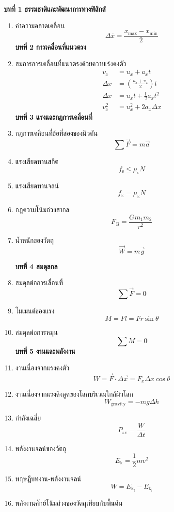 \documentclass[12pt, a4paper]{article}
\begin{document}
	\begin{center}
		\hspace*{1.05cm}
	\end{center}
	\hspace*{1.05cm}\textbf{บทที่ 1 ธรรมชาติและพัฒนาการทางฟิสิกส์}
\begin{enumerate}
	\item ค่าความคลาดเคลื่อน
		\[\Delta \overbar{x}=\frac{x_\text{max}-x_\text{min}}{2}\]
	\textbf{บทที่ 2 การเคลื่อนที่แนวตรง}
	\item สมการการเคลื่อนที่แนวตรงด้วยความเร่งคงตัว
		\begin{align*}
			v_x&=u_x+a_xt\\
			\Delta x&=\left(\frac{u_x+v_x}{2}\right)t\\
			\Delta x&=u_xt+\frac{1}{2}a_xt^2\\
			v_x^2&=u_x^2+2a_x\Delta x
		\end{align*}
	\textbf{บทที่ 3 แรงและกฎการเคลื่อนที่}
	\item กฎการเคลื่อนที่ข้อที่สองของนิวตัน
		\[\sum \vec{F}=m\vec{a}\]
	\item แรงเสียดทานสถิต
		\[f_{\text{s}}\leq\mu_\text{s}N\]
	\item แรงเสียดทานจลน์
		\[f_\text{k}=\mu_\text{k}N\]
	\item กฎความโน้มถ่วงสากล
		\[F_\text{G}=\frac{Gm_1m_2}{r^2}\]
	\item น้ำหนักของวัตถุ
		\[\vec{W}=m\vec{g}\]
	\begin{center}
	\end{center}
	\textbf{บทที่ 4 สมดุลกล}
	\item สมดุลต่อการเลื่อนที่
		\[\sum \vec{F}=0\]
	\item โมเมนต์ของแรง
		\[M=Fl=Fr\sin\theta\]
	\item สมดุลต่อการหมุน
		\[\sum M=0\]
	\textbf{บทที่ 5 งานและพลังงาน}
	\item งานเนื่องจากแรงคงตัว
		  \[W=\vec{F}\cdot\Delta \vec{x}=F_x\Delta x\cos\theta\]
	\item งานเนื่องจากแรงดึงดูดของโลกบริเวณใกล้ผิวโลก
		\[W_{\text{gravity}}=-mg\Delta h\]
	\item กำลังเฉลี่ย
		\[P_{\text{av}}=\frac{W}{\Delta t}\]
	\item พลังงานจลน์ของวัตถุ
		\[E_\text{k}=\frac{1}{2}mv^2\]
	\item ทฤษฎีบทงาน-พลังงานจลน์
		\[W=E_\mathrm{k_f}-E_\mathrm{k_i}\]
	\item พลังงานศักย์โน้มถ่วงของวัตถุเทียบกับพื้นดิน

\end{enumerate}
\end{document}
